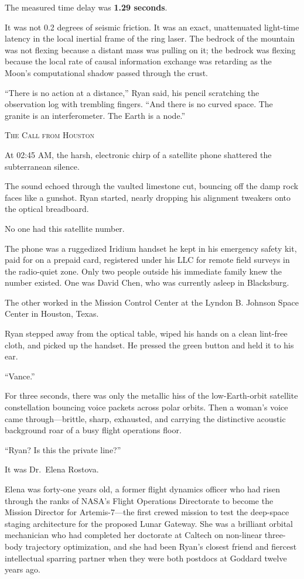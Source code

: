 \documentclass[12pt,twoside,openright]{book}
\newcommand{\sceneheader}[1]{%
  \par\vspace{1.8em}%
  {\noindent\centering\scshape\large #1\par}%
  \vspace{1.0em}%
  \noindent%
}
\newcommand{\dinkus}{%
  \par\vspace{1.2em}%
  {\noindent\centering{\large $\ast\quad\ast\quad\ast$}\par}%
  \vspace{1.2em}%
  \noindent%
}
\begin{document}
The measured time delay was \textbf{1.29 seconds}.

It was not 0.2 degrees of seismic friction. It was an exact,
unattenuated light-time latency in the local inertial frame of the ring
laser. The bedrock of the mountain was not flexing because a distant
mass was pulling on it; the bedrock was flexing because the local rate
of causal information exchange was retarding as the Moon's computational
shadow passed through the crust.

``There is no action at a distance,'' Ryan said, his pencil scratching
the observation log with trembling fingers. ``And there is no curved
space. The granite is an interferometer. The Earth is a node.''

\dinkus

\sceneheader{The Call from Houston}

At 02:45 AM, the harsh, electronic chirp of a satellite phone shattered
the subterranean silence.

The sound echoed through the vaulted limestone cut, bouncing off the
damp rock faces like a gunshot. Ryan started, nearly dropping his
alignment tweakers onto the optical breadboard.

No one had this satellite number.

The phone was a ruggedized Iridium handset he kept in his emergency
safety kit, paid for on a prepaid card, registered under his LLC for
remote field surveys in the radio-quiet zone. Only two people outside
his immediate family knew the number existed. One was David Chen, who
was currently asleep in Blacksburg.

The other worked in the Mission Control Center at the Lyndon B. Johnson
Space Center in Houston, Texas.

Ryan stepped away from the optical table, wiped his hands on a clean
lint-free cloth, and picked up the handset. He pressed the green button
and held it to his ear.

``Vance.''

For three seconds, there was only the metallic hiss of the
low-Earth-orbit satellite constellation bouncing voice packets across
polar orbits. Then a woman's voice came through---brittle, sharp,
exhausted, and carrying the distinctive acoustic background roar of a
busy flight operations floor.

``Ryan? Is this the private line?''

It was Dr.~Elena Rostova.

Elena was forty-one years old, a former flight dynamics officer who had
risen through the ranks of NASA's Flight Operations Directorate to
become the Mission Director for Artemis-7---the first crewed mission to
test the deep-space staging architecture for the proposed Lunar Gateway.
She was a brilliant orbital mechanician who had completed her doctorate
at Caltech on non-linear three-body trajectory optimization, and she had
been Ryan's closest friend and fiercest intellectual sparring partner
when they were both postdocs at Goddard twelve years ago.
\end{document}
